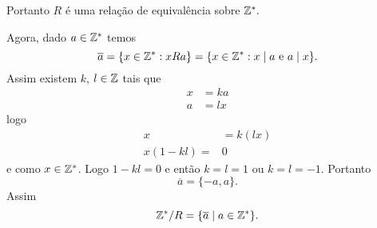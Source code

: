 \documentclass[12pt]{article}
\begin{document}
	Portanto $R$ é uma relação de equivalência sobre $\mathbb{Z}^*.$

	Agora, dado $a \in \mathbb{Z}^*$ temos
	\[
		\overline{a} = \{x \in \mathbb{Z}^* : xRa\} = \{ x \in \mathbb{Z}^* : x \mid a \mbox{ e } a \mid x\}.
	\]
	Assim existem $k$, $l \in \mathbb{Z}$ tais que
	\begin{align*}
		x &= ka\\
		a &= lx
	\end{align*}
	logo
	\begin{align*}
		x &= k(lx)\\
		x(1 - kl) =& 0
	\end{align*}
	e como $x \in \mathbb{Z}^*$. Logo $1 - kl = 0$ e então $k = l = 1$ ou $k = l = -1$. Portanto
	\[
		\overline{a} = \{-a,a\}.
	\]
	Assim
	\[
		\mathbb{Z}^*/R = \{\overline{a} \mid a \in \mathbb{Z}^*\}.
	\]
\end{document}
